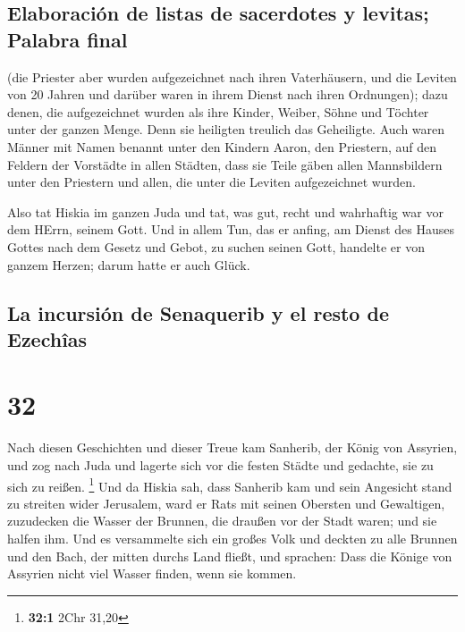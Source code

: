 \hypertarget{elaboraciuxf3n-de-listas-de-sacerdotes-y-levitas-palabra-final}{%
\subsection{Elaboración de listas de sacerdotes y levitas; Palabra
final}\label{elaboraciuxf3n-de-listas-de-sacerdotes-y-levitas-palabra-final}}

 (die Priester aber wurden aufgezeichnet nach ihren
Vaterhäusern, und die Leviten von 20 Jahren und darüber waren in ihrem
Dienst nach ihren Ordnungen);  dazu denen, die
aufgezeichnet wurden als ihre Kinder, Weiber, Söhne und Töchter unter
der ganzen Menge. Denn sie heiligten treulich das Geheiligte.
 Auch waren Männer mit Namen benannt unter den Kindern
Aaron, den Priestern, auf den Feldern der Vorstädte in allen Städten,
dass sie Teile gäben allen Mannsbildern unter den Priestern und allen,
die unter die Leviten aufgezeichnet wurden.

 Also tat Hiskia im ganzen Juda und tat, was gut, recht
und wahrhaftig war vor dem HErrn, seinem Gott.  Und in
allem Tun, das er anfing, am Dienst des Hauses Gottes nach dem Gesetz
und Gebot, zu suchen seinen Gott, handelte er von ganzem Herzen; darum
hatte er auch Glück.

\hypertarget{la-incursiuxf3n-de-senaquerib-y-el-resto-de-ezechuxeeas}{%
\subsection{La incursión de Senaquerib y el resto de
Ezechîas}\label{la-incursiuxf3n-de-senaquerib-y-el-resto-de-ezechuxeeas}}

\hypertarget{section-31}{%
\section{32}\label{section-31}}

 Nach diesen Geschichten und dieser Treue kam Sanherib,
der König von Assyrien, und zog nach Juda und lagerte sich vor die
festen Städte und gedachte, sie zu sich zu reißen. \footnote{\textbf{32:1}
  2Chr 31,20}  Und da Hiskia sah, dass Sanherib kam und
sein Angesicht stand zu streiten wider Jerusalem,  ward er
Rats mit seinen Obersten und Gewaltigen, zuzudecken die Wasser der
Brunnen, die draußen vor der Stadt waren; und sie halfen ihm.
 Und es versammelte sich ein großes Volk und deckten zu
alle Brunnen und den Bach, der mitten durchs Land fließt, und sprachen:
Dass die Könige von Assyrien nicht viel Wasser finden, wenn sie kommen.

